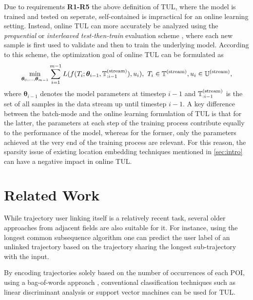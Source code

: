\documentclass{article} %
\theoremstyle{definition}
\begin{document}
Due to requirements \textbf{R1-R5} the above definition of TUL, where the model is trained and tested on seperate, self-contained is impractical for an online learning setting.
Instead, online TUL can more accurately be analyzed using the \textit{prequential} or \textit{interleaved test-then-train} evaluation scheme \citep{bifetMOAMassiveOnline2010}, where each new sample is first used to validate and then to train the underlying model.
According to this scheme, the optimization goal of online TUL can be formulated as
\begin{equation} %
    \min_{\bm{\theta}_0, ..., \bm{\theta}_{m-1}} \sum_{i=1}^{m-1} L(f(T_{i}; \bm{\theta}_{i-1}, \sT^{(\rm{stream})}_{:i-1}), u_{i}), \ T_i \in \sT^{(\rm{stream})}, u_i \in \sU^{(\rm{stream})},
\end{equation}
where $\bm{\theta}_{i-1}$ denotes the model parameters at timestep $i-1$ and ${\mathbb{T}}^{(\rm{stream})}_{:i-1}$ is the set of all samples in the data stream up until timestep $i-1$.
A key difference between the batch-mode and the online learning formulation of TUL is that for the latter, the parameters at each step of the training process contribute equally to the performance of the model, whereas for the former, only the parameters achieved at the very end of the training process are relevant.
For this reason, the sparsity issue of existing location embedding techniques mentioned in \ref{sec:intro} can have a negative impact in online TUL.


\section{Related Work}

While trajectory user linking itself is a relatively recent task, several older approaches from adjacent fields are also suitable for it.
For instance, using the longest common subsequence algorithm \citep{yingSemanticTrajectoryMining2011} one can predict the user label of an unlinked trajectory based on the trajectory sharing the longest sub-trajectory with the input.

By encoding trajectories solely based on the number of occurrences of each POI, using a bag-of-words approach \citep{mikolovEfficientEstimationWord2013}, conventional classification techniques such as linear discriminant analysis or support vector machines can be used for TUL.
\end{document}
